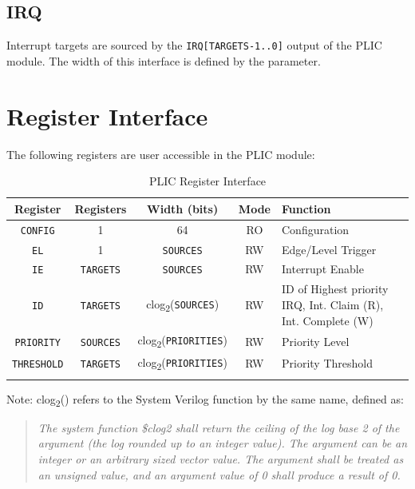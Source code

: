 \subsection{IRQ}

Interrupt targets are sourced by the \texttt{IRQ{[}TARGETS-1..0{]}}
output of the PLIC module. The width of this interface is defined by the
\texttt{} parameter.

\section{Register Interface}

The following registers are user accessible in the PLIC module:

\begin{longtable}[c]{@{\extracolsep{\fill}}ccccp{5cm}@{\extracolsep{\fill}}}	
	\toprule 
	\textbf{Register}  & \textbf{Registers} & \textbf{Width (bits)} & \textbf{Mode} & \textbf{Function} \\
	\midrule 
	\endhead
	\texttt{CONFIG}    & 1 & 64 & RO & Configuration\\
	\texttt{EL}        & 1 & \texttt{SOURCES} & RW & Edge/Level Trigger\\
	\texttt{IE}        & \texttt{TARGETS} & \texttt{SOURCES} & RW & Interrupt Enable\\
	\texttt{ID}        & \texttt{TARGETS} & clog\textsubscript{2}(\texttt{SOURCES}) & RW & ID of Highest priority IRQ, \newline Int. Claim (R), \newline Int. Complete (W)\\
	\texttt{PRIORITY}  & \texttt{SOURCES} & clog\textsubscript{2}(\texttt{PRIORITIES}) & RW & Priority Level\\
	\texttt{THRESHOLD} & \texttt{TARGETS} & clog\textsubscript{2}(\texttt{PRIORITIES}) & RW & Priority Threshold \\
	\bottomrule 	

\caption{PLIC Register Interface}
\label{tab:REGIF2}
\end{longtable}

Note: clog\textsubscript{2}() refers to the System Verilog function by
the same name, defined as:

\begin{quote}
\emph{The system function \$clog2 shall return the ceiling of the log
base 2 of the argument (the log rounded up to an integer value). The
argument can be an integer or an arbitrary sized vector value. The
argument shall be treated as an unsigned value, and an argument value of
0 shall produce a result of 0.}
\end{quote}

